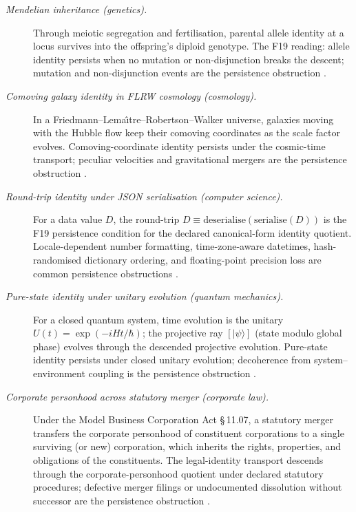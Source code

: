 \documentclass[11pt]{article}
\theoremstyle{definition}
\begin{document}
\begin{description}
\item[\emph{Mendelian inheritance (genetics).}]
Through meiotic segregation and fertilisation, parental allele
identity at a locus survives into the offspring's diploid
genotype.  The F19 reading: allele identity persists when no
mutation or non-disjunction breaks the descent; mutation and
non-disjunction events are the persistence obstruction
\citep{Mendel1866VersuchePflanzenHybriden}.

\item[\emph{Comoving galaxy identity in FLRW cosmology
(cosmology).}]
In a Friedmann--Lema{\^\i}tre--Robertson--Walker universe, galaxies
moving with the Hubble flow keep their comoving coordinates as the
scale factor evolves.  Comoving-coordinate identity persists under
the cosmic-time transport; peculiar velocities and gravitational
mergers are the persistence obstruction
\citep{Friedmann1922KrummungRaumes}.

\item[\emph{Round-trip identity under {JSON} serialisation
(computer science).}]
For a data value \(D\), the round-trip
\(D\equiv\mathrm{deserialise}(\mathrm{serialise}(D))\) is the F19
persistence condition for the declared canonical-form identity
quotient.  Locale-dependent number formatting, time-zone-aware
datetimes, hash-randomised dictionary ordering, and floating-point
precision loss are common persistence obstructions
\citep{Crockford2006JSON}.

\item[\emph{Pure-state identity under unitary evolution (quantum
mechanics).}]
For a closed quantum system, time evolution is the unitary
\(U(t)=\exp(-iHt/\hbar)\); the projective ray
\([|\psi\rangle]\) (state modulo global phase) evolves through the
descended projective evolution.  Pure-state identity persists
under closed unitary evolution; decoherence from system--
environment coupling is the persistence obstruction
\citep{vonNeumann1932MathematischeGrundlagen}.

\item[\emph{Corporate personhood across statutory merger
(corporate law).}]
Under the Model Business Corporation Act \S\,11.07, a statutory
merger transfers the corporate personhood of constituent
corporations to a single surviving (or new) corporation, which
inherits the rights, properties, and obligations of the
constituents.  The legal-identity transport descends through the
corporate-personhood quotient under declared statutory procedures;
defective merger filings or undocumented dissolution without
successor are the persistence obstruction
\citep{MBCA2016Section1107}.
\end{description}
\end{document}
